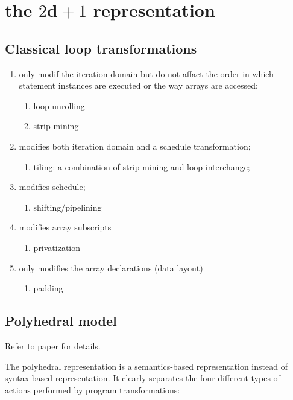 

\section{the $2\mathbf{d}+1$ representation}

\subsection {Classical loop transformations}

\begin{enumerate}
  \item only modif the iteration domain but do not affact the order in which
  statement instances are executed or the way arrays are accessed;
  \begin{enumerate}
    \item loop unrolling
    \item strip-mining
  \end{enumerate}
  \item modifies both iteration domain and a schedule transformation;
  \begin{enumerate}
    \item tiling: a combination of strip-mining and loop interchange;
  \end{enumerate}
  \item modifies schedule;
  \begin{enumerate}
    \item shifting/pipelining
  \end{enumerate}
  \item modifies array subscripts
  \begin{enumerate}
    \item privatization
  \end{enumerate}
  \item only modifies the array declarations (data layout)
  \begin{enumerate}
    \item padding
  \end{enumerate}
\end{enumerate}

\subsection{Polyhedral model}
Refer to paper \cite{girbal2006semi}\cite{vasilache2007scalable} for details.

The polyhedral representation is a semantics-based representation instead of
syntax-based representation. It clearly separates the four different types of
actions performed by program transformations:

